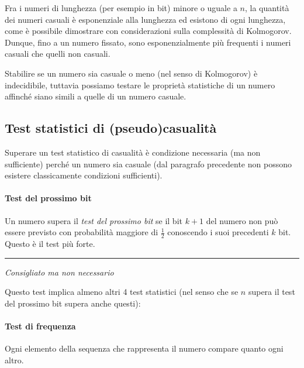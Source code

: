 \documentclass{article}
\begin{document}
Fra i numeri di lunghezza (per esempio in bit) minore o uguale a $n$, la quantità dei numeri casuali è esponenziale alla lunghezza ed esistono di ogni lunghezza, come è possibile dimostrare con considerazioni sulla complessità di Kolmogorov.
Dunque, fino a un numero fissato, sono esponenzialmente più frequenti i numeri casuali che quelli non casuali.

Stabilire se un numero sia casuale o meno (nel senso di Kolmogorov) è indecidibile, tuttavia possiamo testare le proprietà statistiche di un numero affinché siano simili a quelle di un numero casuale.

\subsection{Test statistici di (pseudo)casualità}

Superare un test statistico di casualità è condizione necessaria (ma non sufficiente) perché un numero sia casuale (dal paragrafo precedente non possono esistere classicamente condizioni sufficienti).

\paragraph{Test del prossimo bit}

Un numero supera il \emph{test del prossimo bit} se il bit $k+1$ del numero non può essere previsto con probabilità maggiore di $\frac{1}{2}$ conoscendo i suoi precedenti $k$ bit. Questo è il test più forte.
\hrule
\emph{Consigliato ma non necessario}

Questo test implica almeno altri 4 test statistici (nel senso che se $n$ supera il test del prossimo bit supera anche questi):
\paragraph{Test di frequenza}
Ogni elemento della sequenza che rappresenta il numero compare quanto ogni altro.
\end{document}
